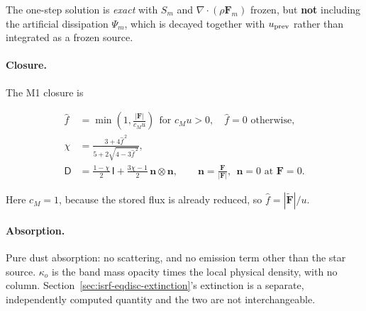 The one-step solution is \emph{exact} with $S_m$ and
$\nabla\!\cdot\!(\rho\boldsymbol{F}_m)$ frozen, but \textbf{not} including the
artificial dissipation $\Psi_m$, which is decayed together with $u_{\rm prev}$
rather than integrated as a frozen source.

\paragraph{Closure.} The M1 closure is

\begin{align}
  \hat f &= \min\!\left(1, \frac{|\boldsymbol{F}|}{c_M u}\right)
    \ \ \text{for } c_M u > 0, \quad \hat f = 0 \text{ otherwise},
  \label{eq:isrfd-fhat} \\
  \chi &= \frac{3 + 4\hat f^{\,2}}{5 + 2\sqrt{4 - 3\hat f^{\,2}}},
  \label{eq:isrfd-chi} \\
  \mathsf{D} &= \frac{1-\chi}{2}\,\mathsf{I}
    + \frac{3\chi - 1}{2}\, \boldsymbol{n}\otimes\boldsymbol{n},
    \qquad \boldsymbol{n} = \frac{\boldsymbol{F}}{|\boldsymbol{F}|},
    \ \ \boldsymbol{n} = 0 \text{ at } \boldsymbol{F} = 0 .
  \label{eq:isrfd-eddington}
\end{align}

Here $c_M = 1$, because the stored
flux is already reduced, so $\hat f = |\tilde{\boldsymbol{F}}|/u$.

\paragraph{Absorption.} Pure dust absorption: no scattering, and no emission term
other than the star source. $\kappa_o$ is the band mass opacity times the local
physical density, with no column.
Section~\ref{sec:isrf-eqdisc-extinction}'s extinction is a separate,
independently computed quantity and the two are not
interchangeable.

